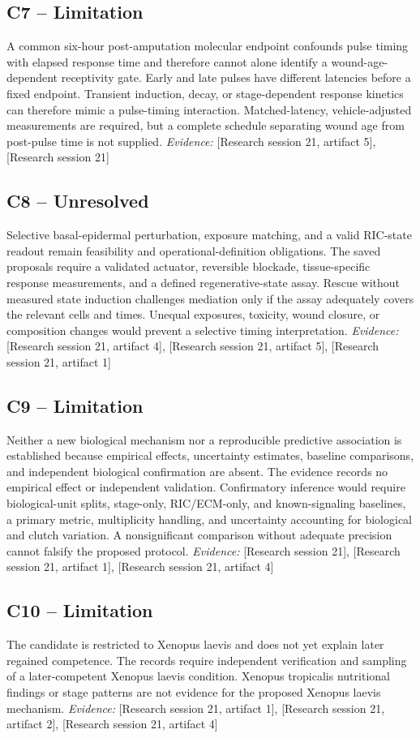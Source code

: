 \documentclass[11pt]{article}
\begin{document}
\subsection{C7 -- Limitation}
A common six-hour post-amputation molecular endpoint confounds pulse timing with elapsed response time and therefore cannot alone identify a wound-age-dependent receptivity gate.
Early and late pulses have different latencies before a fixed endpoint. Transient induction, decay, or stage-dependent response kinetics can therefore mimic a pulse-timing interaction. Matched-latency, vehicle-adjusted measurements are required, but a complete schedule separating wound age from post-pulse time is not supplied.
\textit{Evidence: }[Research session 21, artifact 5], [Research session 21]
\subsection{C8 -- Unresolved}
Selective basal-epidermal perturbation, exposure matching, and a valid RIC-state readout remain feasibility and operational-definition obligations.
The saved proposals require a validated actuator, reversible blockade, tissue-specific response measurements, and a defined regenerative-state assay. Rescue without measured state induction challenges mediation only if the assay adequately covers the relevant cells and times. Unequal exposures, toxicity, wound closure, or composition changes would prevent a selective timing interpretation.
\textit{Evidence: }[Research session 21, artifact 4], [Research session 21, artifact 5], [Research session 21, artifact 1]
\subsection{C9 -- Limitation}
Neither a new biological mechanism nor a reproducible predictive association is established because empirical effects, uncertainty estimates, baseline comparisons, and independent biological confirmation are absent.
The evidence records no empirical effect or independent validation. Confirmatory inference would require biological-unit splits, stage-only, RIC/ECM-only, and known-signaling baselines, a primary metric, multiplicity handling, and uncertainty accounting for biological and clutch variation. A nonsignificant comparison without adequate precision cannot falsify the proposed protocol.
\textit{Evidence: }[Research session 21], [Research session 21, artifact 1], [Research session 21, artifact 4]
\subsection{C10 -- Limitation}
The candidate is restricted to Xenopus laevis and does not yet explain later regained competence.
The records require independent verification and sampling of a later-competent Xenopus laevis condition. Xenopus tropicalis nutritional findings or stage patterns are not evidence for the proposed Xenopus laevis mechanism.
\textit{Evidence: }[Research session 21, artifact 1], [Research session 21, artifact 2], [Research session 21, artifact 4]
\end{document}
